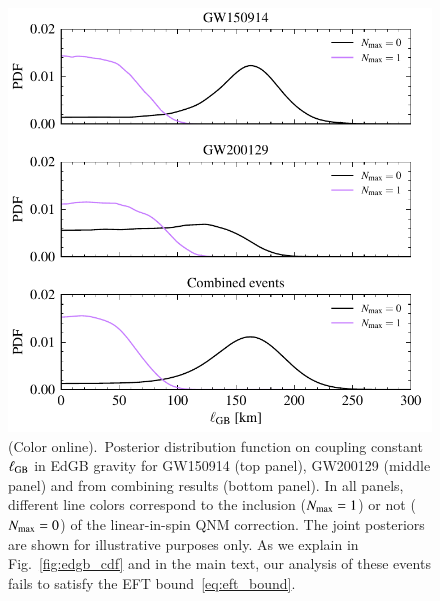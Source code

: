 \documentclass[twocolumn,
               prd,
               aps,
               superscriptaddress,
               tightenlines,
               nofootinbib,
               eqsecnum,
               amsfonts,
               amsmath,
               longbibliography]{revtex4-1}
\begin{document}
\begin{figure}[t]
\includegraphics[width=\columnwidth]{figs/edgb_posteriors_combined.pdf}
\caption{(Color online).~Posterior distribution function on coupling constant $\ell_{\rm GB}$ in EdGB gravity
for GW150914 (top panel), GW200129 (middle panel)
and from combining results (bottom panel).
%
In all panels, different line colors correspond to the inclusion ($N_{\rm max} = 1$) or not ($N_{\rm max} = 0$)
of the linear-in-spin QNM correction.
%
The joint posteriors are shown for illustrative purposes only. As we explain in Fig.~\ref{fig:edgb_cdf} and
in the main text, our analysis of these events fails to satisfy the EFT bound~\eqref{eq:eft_bound}.
}
\label{fig:edgb_exec_sum}
\end{figure}
\end{document}
